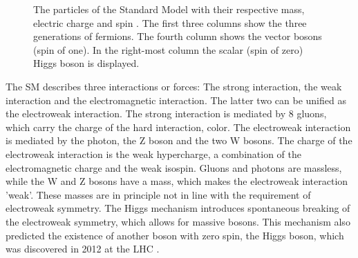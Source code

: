 \begin{figure}[htbp!]
  \begin{center}

\caption{The particles of the Standard Model with their respective mass, electric charge and spin \cite{SMPart}. The first three columns show the three generations of fermions. 
The fourth column shows the vector bosons (spin of one). In the right-most column the scalar (spin of zero) Higgs boson is displayed.
  \label{fig:theo_part}}
  \end{center}
\end{figure}


The SM describes three interactions or forces: The strong interaction, the weak interaction and the electromagnetic interaction. The latter two can be unified as  the electroweak interaction.
The strong interaction is mediated by 8 gluons, which carry the charge of the hard interaction, color.
The electroweak interaction is mediated by the photon, the Z boson and the two W bosons. The charge of the electroweak interaction is the weak hypercharge, a combination of the electromagnetic
charge and the weak isospin. Gluons and photons are massless, while the W and Z bosons have a mass, which makes the electroweak interaction 'weak'. These masses are in principle not in line with the  requirement of electroweak symmetry.
The Higgs mechanism \cite{HIGGS1964132,PhysRevLett.13.321,PhysRevLett.13.585} introduces spontaneous breaking of the electroweak symmetry, which allows for massive bosons.
This mechanism also predicted the existence of another boson with zero spin, the Higgs boson, which was discovered in 2012 at the LHC \cite{201230,20121}.

